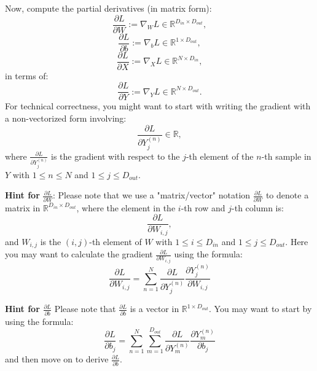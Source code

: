 \documentclass[lang=cn,11pt]{elegantbook}
\begin{document}
Now, compute the partial derivatives (in matrix form):
\begin{equation}
    \frac{\partial L}{\partial W} :=\nabla_W L \in \mathbb{R}^{D_{in} \times D_{out}},
\end{equation}
\begin{equation}
    \frac{\partial L}{\partial b} :=\nabla_b L \in \mathbb{R}^{1 \times D_{out}},
\end{equation}
\begin{equation}
    \frac{\partial L}{\partial X} := \nabla_X L \in \mathbb{R}^{N \times D_{in}},
\end{equation}
in terms of:
\begin{equation}
    \frac{\partial L}{\partial Y}:= \nabla_Y L \in \mathbb{R}^{N \times D_{out}}.
\end{equation}
For technical correctness, you might want to start with writing the gradient with a non-vectorized form involving:
\begin{equation}
    \frac{\partial L}{\partial Y^{(n)}_j} \in \mathbb{R},
\end{equation}
where $\frac{\partial L}{\partial Y^{(n)}_j}$ is the gradient with respect to the $j$-th element of the $n$-th sample in $Y$ with $1 \leq n \leq N$ and $1 \leq j \leq D_{out}$.

\textbf{Hint for } $\frac{\partial L}{\partial W}$:
Please note that we use a "matrix/vector" notation $\frac{\partial L}{\partial W}$ to denote a matrix in $\mathbb{R}^{D_{in} \times D_{out}}$, where the element in the $i$-th row and $j$-th column is:
\begin{equation}
    \frac{\partial L}{\partial W_{i,j}},
\end{equation}
and $W_{i,j}$ is the $(i,j)$-th element of $W$ with \( 1 \leq i \leq D_{in} \) and \( 1 \leq j \leq D_{out} \). Here you may want to calculate the gradient \( \frac{\partial L}{\partial W_{i,j}} \) using the formula: \[
\frac{\partial L}{\partial W_{i,j}} = \sum_{n=1}^{N} \frac{\partial L}{\partial Y_j^{(n)}} \frac{\partial Y_j^{(n)}}{\partial W_{i,j}}
\]
\begin{solution}
\end{solution}

\textbf{Hint for \( \frac{\partial L}{\partial b} \)}
Please note that \( \frac{\partial L}{\partial b} \) is a vector in \( \mathbb{R}^{1 \times D_{out}} \). You may want to start by using the formula:\[
\frac{\partial L}{\partial b_j} = \sum_{n=1}^{N} \sum_{m=1}^{D_{out}} \frac{\partial L}{\partial Y_m^{(n)}} \frac{\partial Y_m^{(n)}}{\partial b_j}
\]and then move on to derive \( \frac{\partial L}{\partial b} \).
\begin{solution}
\end{solution}
\end{document}
